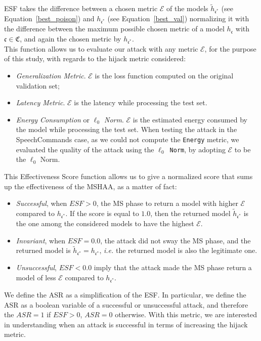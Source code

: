 ESF takes the difference between a chosen metric $\mathcal{E}$ of the models $\tilde{h}_{\mathfrak{c}^*}$ (see Equation~\ref{best_poison}) and $h_{\mathfrak{c}^*}$ (see Equation~\ref{best_val}) normalizing it with the difference between the maximum possible chosen metric of a model $h_\mathfrak{c}$ with $\mathfrak{c} \in \mathfrak{C}$, and again the chosen metric by $h_{\mathfrak{c}^*}$.\\
This function allows us to evaluate our attack with any metric $\mathcal{E}$, for the purpose of this study, with regards to the hijack metric considered:
\begin{itemize}
    \item \textit{Generalization Metric}. $\mathcal{E}$ is the loss function computed on the original validation set;
    \item \textit{Latency Metric}. $\mathcal{E}$ is the latency while processing the test set.
    \item \textit{Energy Consumption} or \textit{$\ell_0$ Norm}. $\mathcal{E}$ is the estimated energy consumed by the model while processing the test set. When testing the attack in the SpeechCommands case, as we could not compute the \texttt{Energy} metric, we evaluated the quality of the attack using the \texttt{$\ell_0$ Norm}, by adopting $\mathcal{E}$ to be the $\ell_0$ Norm.
\end{itemize}
This Effectiveness Score function allows us to give a normalized score that sums up the effectiveness of the MSHAA, as a matter of fact:
\begin{itemize}
    \item \textit{Successful}, when $ESF > 0$, the MS phase to return a model with higher $\mathcal{E}$ compared to $h_{\mathfrak{c}^*}$. If the score is equal to $1.0$, then the returned model $\tilde{h}_{\mathfrak{c}^*}$ is the one among the considered models to have the highest $\mathcal{E}$.
    \item \textit{Invariant}, when $ESF = 0.0$, the attack did not sway the MS phase, and the returned model is $\tilde{h}_{\mathfrak{c}^*} = h_{\mathfrak{c}^*}$, \textit{i.e.} the returned model is also the legitimate one. 
    \item \textit{Unsuccessful}, $ESF < 0.0$ imply that the attack made the MS phase return a model of less $\mathcal{E}$ compared to $h_{\mathfrak{c}^*}$.
\end{itemize}  
\par
We define the ASR as a simplification of the ESF. In particular, we define the ASR as a boolean variable of a successful or unsuccessful attack, and therefore the $ASR = 1$ if $ESF > 0$, $ASR = 0$ otherwise. 
With this metric, we are interested in understanding when an attack is successful in terms of increasing the hijack metric. 

